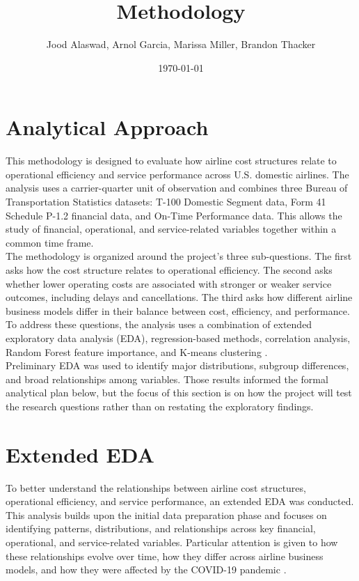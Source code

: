 \documentclass[11pt, letterpaper]{article}
\begin{document}
\title{Methodology}
\author{Jood Alaswad, Arnol Garcia, Marissa Miller, Brandon Thacker}
\date{\today}
\maketitle

\tableofcontents
\newpage
\setcounter{page}{1}

\section{Analytical Approach}
This methodology is designed to evaluate how airline cost structures relate to operational efficiency and service performance across U.S. domestic airlines. The analysis uses a carrier-quarter unit of observation and combines three Bureau of Transportation Statistics datasets: T-100 Domestic Segment data, Form 41 Schedule P-1.2 financial data, and On-Time Performance data. This allows the study of financial, operational, and service-related variables together within a common time frame.\\
\indent The methodology is organized around the project’s three sub-questions. The first asks how the cost structure relates to operational efficiency. The second asks whether lower operating costs are associated with stronger or weaker service outcomes, including delays and cancellations. The third asks how different airline business models differ in their balance between cost, efficiency, and performance. To address these questions, the analysis uses a combination of extended exploratory data analysis (EDA), regression-based methods, correlation analysis, Random Forest feature importance, and K-means clustering \cite{kaya2023, li2025, nguyen2022}.\\
\indent Preliminary EDA was used to identify major distributions, subgroup differences, and broad relationships among variables. Those results informed the formal analytical plan below, but the focus of this section is on how the project will test the research questions rather than on restating the exploratory findings.

\section{Extended EDA}
To better understand the relationships between airline cost structures, operational efficiency, and service performance, an extended EDA was conducted. This analysis builds upon the initial data preparation phase and focuses on identifying patterns, distributions, and relationships across key financial, operational, and service-related variables. Particular attention is given to how these relationships evolve over time, how they differ across airline business models, and how they were affected by the COVID-19 pandemic \cite{fontanet2022, gudmundsson2021}.
\end{document}
